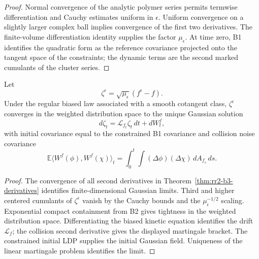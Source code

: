 \begin{proof}
Normal convergence of the analytic polymer series permits termwise
differentiation and Cauchy estimates uniform in \(\epsilon\).  Uniform
convergence on a slightly larger complex ball implies convergence of the
first two derivatives.  The finite-volume differentiation identity supplies
the factor \(\mu_\epsilon\).  At time zero, B1 identifies the quadratic form
as the reference covariance projected onto the tangent space of the
constraints; the dynamic terms are the second marked cumulants of the
cluster series.
\end{proof}

\begin{theorem}
\label{thm:rr2-b3-fluctuation}
Let
\[
 \zeta^\epsilon=\sqrt{\mu_\epsilon}(f^\epsilon-f).
\]
Under the regular biased law associated with a smooth cotangent class,
\(\zeta^\epsilon\) converges in the weighted distribution space to the unique
Gaussian solution
\[
 d\zeta_t=\mathcal L_{f_t}\zeta_t\,dt+dW_t^{f},
\]
with initial covariance equal to the constrained B1 covariance and collision
noise covariance
\[
 \mathbb E\langle W^f(\phi),W^f(\chi)\rangle_t
 =
 \int_0^t\!\int
 (\Delta\phi)(\Delta\chi)\,dA_{f_s}\,ds .
\]
\end{theorem}

\begin{proof}
The convergence of all second derivatives in
Theorem~\ref{thm:rr2-b3-derivatives} identifies finite-dimensional Gaussian
limits.  Third and higher centered cumulants of
\(\zeta^\epsilon\) vanish by the Cauchy bounds and the
\(\mu_\epsilon^{-1/2}\) scaling.  Exponential compact containment from B2
gives tightness in the weighted distribution space.  Differentiating the
biased kinetic equation identifies the drift \(\mathcal L_f\); the collision
second derivative gives the displayed martingale bracket.  The constrained
initial LDP supplies the initial Gaussian field.  Uniqueness of the linear
martingale problem identifies the limit.
\end{proof}

